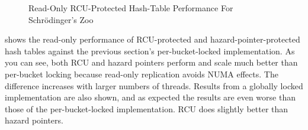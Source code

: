 \begin{figure}
\centering
{}
\caption{Read-Only RCU-Protected Hash-Table Performance For Schr\"odinger's Zoo}
\label{fig:datastruct:Read-Only RCU-Protected Hash-Table Performance For Schroedinger's Zoo}
\end{figure}

shows the read-only performance of RCU-protected and hazard-pointer-protected
hash tables against the previous section's per-bucket-locked implementation.
As you can see, both RCU and hazard pointers perform and scale
much better than per-bucket locking because read-only
replication avoids NUMA effects.
The difference increases with larger numbers of threads.
Results from a globally locked implementation are also shown, and as expected
the results are even worse than those of the per-bucket-locked implementation.
RCU does slightly better than hazard pointers.

